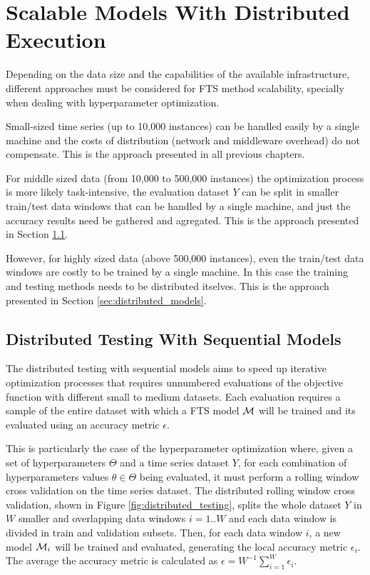 \section{Scalable Models With Distributed Execution}
\label{sec:distributed}

Depending on the data size and the capabilities of the available infrastructure, different approaches must be considered for FTS method scalability, specially when dealing with hyperparameter optimization. 

Small-sized time series (up to 10,000 instances) can be handled easily by a single machine and the costs of distribution (network and middleware overhead) do not compensate. This is the approach presented in all previous chapters.

For middle sized data (from 10,000 to 500,000 instances) the optimization process is more likely task-intensive, the evaluation dataset $Y$ can be split in smaller train/test data windows that can be handled by a single machine, and just the accuracy results need be gathered and agregated. This is the approach presented in Section \ref{sec:distributed_testing}.

However, for highly sized data (above 500,000 instances), even the train/test data windows are costly to be trained by a single machine. In this case the training and testing methods needs to be distributed itselves. This is the approach presented in Section \ref{sec:distributed_models}.



\subsection{Distributed Testing With Sequential Models}
\label{sec:distributed_testing}

The distributed testing with sequential models aims to speed up iterative optimization processes that requires unnumbered evaluations of the objective function with different small to medium datasets. Each evaluation requires a sample of the entire dataset with which a FTS model $\mathcal{M}$ will be trained and its evaluated using an accuracy metric $\epsilon$.

This is particularly the case of the hyperparameter optimization where, given a set of hyperparameters $\Theta$ and a time series dataset $Y$, for each combination of hyperparameters values $\theta \in \Theta$ being evaluated, it must perform a rolling window cross validation on the time series dataset. The distributed rolling window cross validation, shown in Figure \ref{fig:distributed_testing}, splits the whole dataset $Y$ in $W$ smaller and overlapping data windows $i=1..W$ and each data window is divided in train and validation subsets. Then, for each data window $i$, a new model $\mathcal{M}_i$ will be trained and evaluated, generating the local accuracy metric $\epsilon_i$. The average the accuracy metric is calculated as $\epsilon = W^{-1} \sum_{i=1}^W \epsilon_i$.

